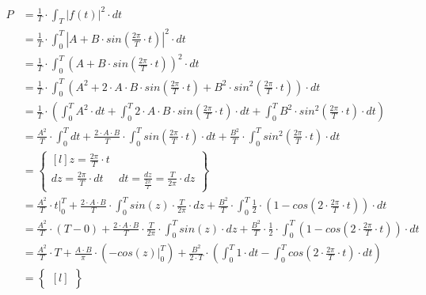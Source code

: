 \begin{task}
\begin{align*}
P&=\frac{1}{T} \cdot \int_{T}^{}\left|f(t)\right|^2 \cdot dt\\
 &=\frac{1}{T} \cdot \int_{0}^{T}\left|A + B \cdot sin\left(\frac{2\pi}{T}\cdot t \right) \right|^2 \cdot dt\\ 
 &=\frac{1}{T} \cdot \int_{0}^{T}\left(A + B \cdot sin\left(\frac{2\pi}{T}\cdot t \right) \right)^2 \cdot dt\\ 
 &=\frac{1}{T} \cdot \int_{0}^{T}\left(A^2 + 2\cdot A \cdot B \cdot sin\left(\frac{2\pi}{T}\cdot t \right) + B^2 \cdot sin^2\left(\frac{2\pi}{T}\cdot t \right) \right) \cdot dt\\
 &=\frac{1}{T} \cdot \left( \int_{0}^{T}A^2 \cdot dt + \int_{0}^{T} 2\cdot A \cdot B \cdot sin\left(\frac{2\pi}{T}\cdot t \right) \cdot dt + \int_{0}^{T} B^2 \cdot sin^2\left(\frac{2\pi}{T}\cdot t \right)  \cdot dt \right)\\
 &=\frac{A^2}{T} \cdot \int_{0}^{T} dt + \frac{2\cdot A \cdot B}{T} \cdot \int_{0}^{T} sin\left(\frac{2\pi}{T}\cdot t \right) \cdot dt + \frac{B^2}{T} \cdot \int_{0}^{T}  sin^2\left(\frac{2\pi}{T}\cdot t \right)  \cdot dt\\
 &=\begin{Bmatrix*}[l]
 z=\frac{2\pi}{T} \cdot t\\
 dz = \frac{2\pi}{T} \cdot dt & dt = \frac{dz}{\frac{2\pi}{T}} =\frac{T}{2\pi} \cdot dz 
 \end{Bmatrix*}\\
 &=\frac{A^2}{T} \cdot \left. t \right|_{0}^{T} + \frac{2\cdot A \cdot B}{T} \cdot \int_{0}^{T} sin\left(z \right) \cdot \frac{T}{2\pi} \cdot dz + \frac{B^2}{T} \cdot \int_{0}^{T} \frac{1}{2} \cdot \left(1 - cos\left(2 \cdot \frac{2\pi}{T}\cdot t \right) \right)  \cdot dt\\
 &=\frac{A^2}{T} \cdot \left( T - 0 \right) + \frac{2\cdot A \cdot B}{T} \cdot \frac{T}{2\pi} \cdot \int_{0}^{T} sin\left(z \right) \cdot dz + \frac{B^2}{T} \cdot \frac{1}{2} \cdot \int_{0}^{T} \left(1 - cos\left(2 \cdot \frac{2\pi}{T}\cdot t \right) \right)  \cdot dt\\
 &=\frac{A^2}{T} \cdot T + \frac{A \cdot B}{\pi} \cdot \left( \left.-cos\left(z \right)\right|_{0}^{T}  \right) + \frac{B^2}{2 \cdot T} \cdot \left( \int_{0}^{T} 1 \cdot dt - \int_{0}^{T} cos\left(2 \cdot \frac{2\pi}{T}\cdot t \right)  \cdot dt \right)\\
 &=\begin{Bmatrix*}[l]

\end{Bmatrix*}
\end{align*}
\end{task}
